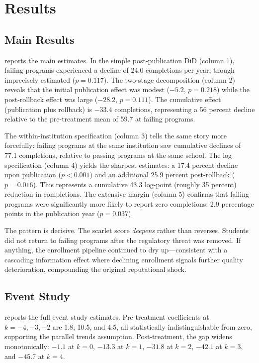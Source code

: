 \documentclass[12pt]{article}
\begin{document}
\section{Results}

\subsection{Main Results}



 reports the main estimates. In the simple post-publication DiD (column 1), failing programs experienced a decline of 24.0 completions per year, though imprecisely estimated ($p = 0.117$). The two-stage decomposition (column 2) reveals that the initial publication effect was modest ($-5.2$, $p = 0.218$) while the post-rollback effect was large ($-28.2$, $p = 0.111$). The cumulative effect (publication plus rollback) is $-33.4$ completions, representing a 56 percent decline relative to the pre-treatment mean of 59.7 at failing programs.

The within-institution specification (column 3) tells the same story more forcefully: failing programs at the same institution saw cumulative declines of 77.1 completions, relative to passing programs at the same school. The log specification (column 4) yields the sharpest estimates: a 17.4 percent decline upon publication ($p < 0.001$) and an additional 25.9 percent post-rollback ($p = 0.016$). This represents a cumulative 43.3 log-point (roughly 35 percent) reduction in completions. The extensive margin (column 5) confirms that failing programs were significantly more likely to report zero completions: 2.9 percentage points in the publication year ($p = 0.037$).

The pattern is decisive. The scarlet score \textit{deepens} rather than reverses. Students did not return to failing programs after the regulatory threat was removed. If anything, the enrollment pipeline continued to dry up---consistent with a cascading information effect where declining enrollment signals further quality deterioration, compounding the original reputational shock.

\subsection{Event Study}



 reports the full event study estimates. Pre-treatment coefficients at $k = -4, -3, -2$ are 1.8, 10.5, and 4.5, all statistically indistinguishable from zero, supporting the parallel trends assumption. Post-treatment, the gap widens monotonically: $-1.1$ at $k = 0$, $-13.3$ at $k = 1$, $-31.8$ at $k = 2$, $-42.1$ at $k = 3$, and $-45.7$ at $k = 4$.
\end{document}
